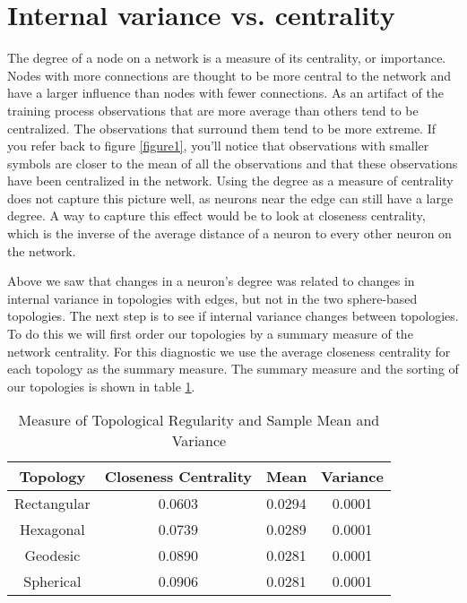 \section{Internal variance vs. centrality}
\label{rdq2}
The degree of a node on a network is a measure of its centrality, or
importance. Nodes with more connections are thought to be more central to
the network and have a larger influence than nodes with fewer connections. As an
artifact of the training process observations that are more average than
others tend to be centralized.  The observations that surround them tend to be
more extreme.  If you refer back to figure \ref{figure1}, you'll notice that
observations with smaller symbols are closer to the mean of all the
observations and that these observations have been centralized in the network.
Using the degree as a measure of centrality does not capture this picture
well, as neurons near the edge can still have a large degree.  A way to
capture this effect would be to look at closeness centrality, which is the
inverse of the average distance of a neuron to every other neuron on the
network.

Above we saw that changes in a neuron's degree was related to changes in
internal variance in topologies with edges, but not in the two sphere-based
topologies. The next step is to see if internal variance changes between
topologies.  To do this we will first order our topologies by a summary
measure of the network centrality.  For this diagnostic we use the average
closeness centrality for each topology as the summary measure.  The summary
measure and the sorting of our topologies is shown in table \ref{vardeg}.

\begin{table}
\centering
\begin{minipage}{\textwidth}
\caption{Measure of Topological Regularity and Sample Mean and Variance}
\label{vardeg}
\begin{tabular}{|c||c|c|c|}
\hline
Topology & Closeness Centrality & Mean & Variance\\
\hline
Rectangular & 0.0603 & 0.0294 &0.0001\\
Hexagonal & 0.0739 & 0.0289 &0.0001\\
Geodesic & 0.0890 & 0.0281 &0.0001\\
Spherical & 0.0906 & 0.0281 &0.0001\\
\hline
\end{tabular}
\end{minipage}
\end{table}


